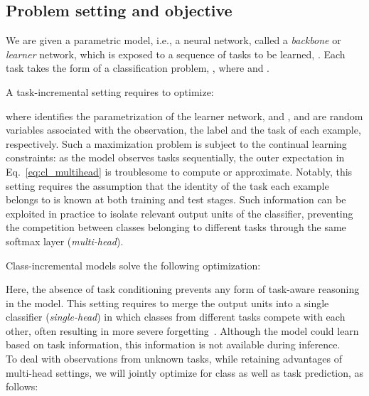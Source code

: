 \documentclass[10pt,twocolumn,letterpaper]{article}
\begin{document}
\subsection{Problem setting and objective}
We are given a parametric model, i.e., a neural network, called a \textit{backbone} or \textit{learner} network, which is exposed to a sequence of  tasks to be learned, . Each task  takes the form of a classification problem, , where  and .

A task-incremental setting requires to optimize:

where  identifies the parametrization of the learner network, and ,  and  are random variables associated with the observation, the label and the task of each example, respectively.
Such a maximization problem is subject to the continual learning constraints: as the model observes tasks sequentially, the outer expectation in Eq.~\ref{eq:cl_multihead} is troublesome to compute or approximate. Notably, this setting requires the assumption that the identity of the task each example belongs to is known at both training and test stages. Such information can be exploited in practice to isolate relevant output units of the classifier, preventing the competition between classes belonging to different tasks through the same softmax layer (\textit{multi-head}).

Class-incremental models solve the following optimization:

Here, the absence of task conditioning prevents any form of task-aware reasoning in the model. This setting requires to merge the output units into a single classifier (\textit{single-head}) in which classes from different tasks compete with each other, often resulting in more severe forgetting~\cite{threescenarios}. Although the model could learn based on task information, this information is not available during inference.\\

To deal with observations from unknown tasks, while retaining advantages of multi-head settings, we will jointly optimize for class as well as task prediction, as follows: 
\end{document}
